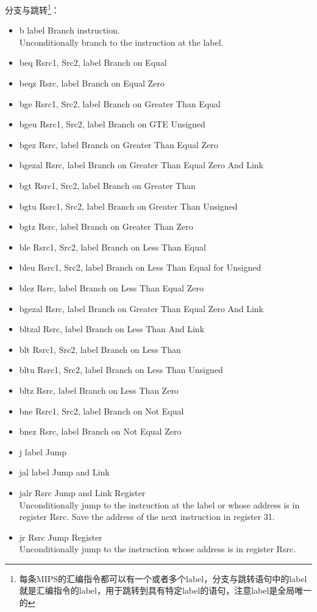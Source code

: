 \documentclass[a4paper, 11pt]{article}
\begin{document}
	分支与跳转\footnote{每条MIPS的汇编指令都可以有一个或者多个label，分支与跳转语句中的label就是汇编指令的label，用于跳转到具有特定label的语句，注意label是全局唯一的}：
	\begin{itemize}
		\item b label	\hfill Branch instruction. \\
			Unconditionally branch to the instruction at the label.
		\item beq Rsrc1, Src2, label	\hfill Branch on Equal
		\item beqz Rsrc, label	Branch on Equal Zero
		\item bge Rsrc1, Src2, label	\hfill Branch on Greater Than Equal
		\item bgeu Rsrc1, Src2, label	\hfill Branch on GTE Unsigned
		\item bgez Rsrc, label	\hfill Branch on Greater Than Equal Zero
		\item bgezal Rsrc, label	\hfill Branch on Greater Than Equal Zero And Link
		\item bgt Rsrc1, Src2, label	\hfill Branch on Greater Than
		\item bgtu Rsrc1, Src2, label	\hfill Branch on Greater Than Unsigned
		\item bgtz Rsrc, label	\hfill Branch on Greater Than Zero
		\item ble Rsrc1, Src2, label	\hfill Branch on Less Than Equal
		\item bleu Rsrc1, Src2, label	\hfill Branch on Less Than Equal for Unsigned
		\item blez Rsrc, label	Branch on Less Than Equal Zero
		\item bgezal Rsrc, label	Branch on Greater Than Equal Zero And Link
		\item bltzal Rsrc, label	\hfill Branch on Less Than And Link
		\item blt Rsrc1, Src2, label	\hfill Branch on Less Than
		\item bltu Rsrc1, Src2, label	\hfill Branch on Less Than Unsigned
		\item bltz Rsrc, label	\hfill Branch on Less Than Zero
		\item bne Rsrc1, Src2, label	\hfill Branch on Not Equal
		\item bnez Rsrc, label	\hfill Branch on Not Equal Zero
		\item j label	\hfill Jump
		\item jal label	\hfill Jump and Link
		\item jalr Rsrc	\hfill Jump and Link Register \\
			Unconditionally jump to the instruction at the label or whose address is in register Rsrc. Save the address of the next instruction in register 31.
		\item jr Rsrc	\hfill Jump Register \\
			Unconditionally jump to the instruction whose address is in register Rsrc.
	\end{itemize}
\end{document}
